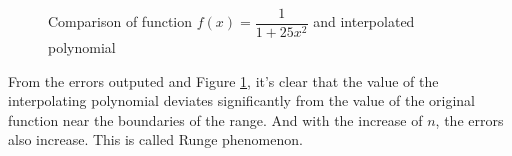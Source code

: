 \documentclass[UTF8,hyperref]{article}
\begin{document}
\begin{figure}[htbp]
    \centering
    \quad
    \quad
    \caption{Comparison of function $f(x)=\dfrac{1}{1+25x^2}$ and interpolated polynomial}
    \label{Fig1}
\end{figure}
\par From the errors outputed and Figure \ref{Fig1}, it's clear that the value of the interpolating polynomial deviates significantly from the value of the original function near the boundaries of the range. And with the increase of $n$, the errors also increase. This is called Runge phenomenon.
\end{document}
